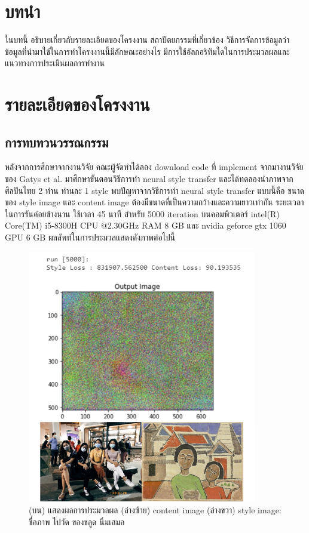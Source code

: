 \documentclass[12pt,oneside,openright,a4paper]{cpe-thai-project}
\begin{document}
\section{บทนำ}
\par\setlength{\parindent}{5ex}
ในบทนี้ อธิบายเกี่ยวกับรายละเอียดของโครงงาน สถาปัตยกรรมที่เกี่ยวข้อง วิธีการจัดการข้อมูลว่า ข้อมูลที่นำมาใช้ในการทำโครงงานนี้มีลักษณะอย่างไร มีการใช้อัลกอริทึมใดในการประมวลผลและแนวทางการประเมินผลการทำงาน

\section{รายละเอียดของโครงงาน}

\subsection{การทบทวนวรรณกรรม}
\par\setlength{\parindent}{5ex} 
หลังจากการศึกษาจากงานวิจัย คณะผู้จัดทำได้ลอง download code ที่ implement จากมางานวิจัยของ Gatys et al. \cite{NeuralTr45:online} มาศึกษาขั้นตอนวิธีการทำ neural style transfer และได้ทดลองนำภาพจากศิลปินไทย 2 ท่าน ท่านละ 1 style พบปัญหาจากวิธีการทำ neural style transfer แบบนี้คือ ขนาดของ style image และ content image ต้องมีขนาดที่เป็นความกว้างและความยาวเท่ากัน ระยะเวลาในการรันค่อยข้างนาน ใช้เวลา 45 นาที สำหรับ 5000 iteration บนคอมพิวเตอร์ intel(R) Core(TM) i5-8300H CPU @2.30GHz RAM 8 GB และ nvidia geforce gtx 1060 GPU 6 GB ผลลัพท์ในการประมวลแสดงดังภาพต่อไปนี้

\begin{figure}[!h]
  \centering
  \includegraphics[width=10cm]{./image/result1.png}
  \caption{(บน) แสดงผลการประมวลผล (ล่างซ้าย) content image (ล่างขวา) style image: ชื่อภาพ ไปวัด ของชลูด นิ่มเสมอ}
  \label{fig:result1}
\end{figure}
\end{document}
